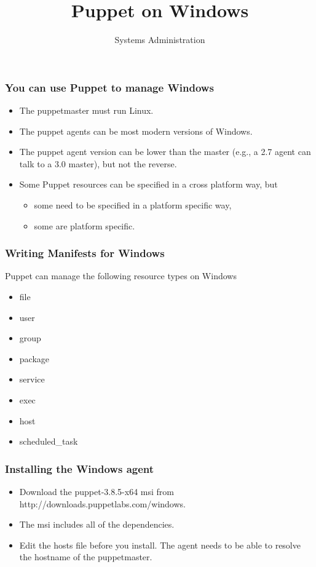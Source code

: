 \documentclass[10pt]{beamer}
\title{Puppet on Windows}
\author[IN719]{Systems Administration}
\institute[Otago Polytechnic]{
  Otago Polytechnic \\
  Dunedin, New Zealand \\
}
\date{}
\begin{document}
\begin{frame}[plain]
  \titlepage
\end{frame}

\begin{frame}
  \frametitle{You can use Puppet to manage Windows}
  
\begin{itemize}
\item The puppetmaster must run Linux.
\item  The puppet agents can be most modern versions of Windows.
\item  The puppet agent version can be lower than the master (e.g., a 2.7 agent can talk to a 3.0 master), but not the reverse.
\item Some Puppet resources can be specified in a cross platform way, but
         \begin{itemize}
\item  some need to be specified in a platform specific way,
\item  some are platform specific.
\end{itemize}
\end{itemize}
\end{frame}


\begin{frame}
 \frametitle{Writing Manifests for Windows}
  
Puppet can manage the following resource types on Windows
\begin{itemize}
\item file
\item user
\item group
\item package
\item service
\item exec
\item host
\item scheduled\_task
\end{itemize}


\end{frame}

\begin{frame}
  \frametitle{Installing the Windows agent}
  
\begin{itemize}
\item Download the puppet-3.8.5-x64 msi from http://downloads.puppetlabs.com/windows.
\item The msi includes all of the dependencies.
\item Edit the hosts file before you install.  The agent needs to be able to resolve the hostname of the puppetmaster. 
\end{itemize}


\end{frame}
\end{document}
